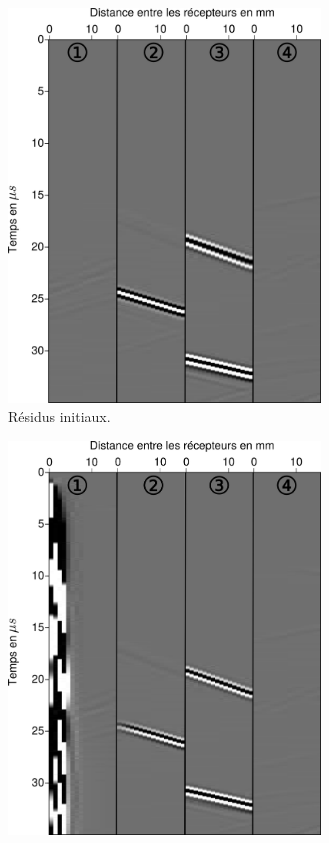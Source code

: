 \begin{figure}[h!]
\begin{changemargin}{-1cm}{-2cm}
\begin{subfigure}[b]{0.29\textwidth}
		\includegraphics[width=0.91\textwidth]{img/epsilon/residu_init.png}
		\caption{Résidus initiaux. \label{app:ani:data_av}}
	\end{subfigure}
	\begin{subfigure}[b]{0.29\textwidth}
		\centering
		\includegraphics[width=0.91\textwidth]{img/epsilon/residu_final.png}

\end{subfigure}
\end{changemargin}
\end{figure}
